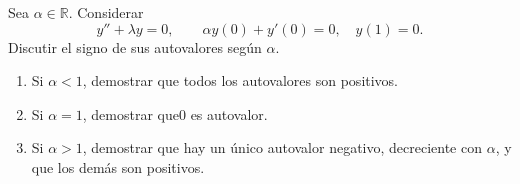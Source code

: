 Sea \(\alpha\in\mathbb R\). Considerar
\[y''+\lambda y=0,\qquad \alpha y(0)+y'(0)=0,\quad y(1)=0.\]
Discutir el signo de sus autovalores según \ensuremath{\alpha}.

\begin{enumerate}[label=(\alph*),ref=\alph*,leftmargin=*]
\item Si \(\alpha<1\), demostrar que todos los autovalores son positivos.
\item Si \(\alpha=1\), demostrar que0 es autovalor.
\item Si \(\alpha>1\), demostrar que hay un único autovalor negativo, decreciente con \ensuremath{\alpha}, y que los demás son positivos.
\end{enumerate}
